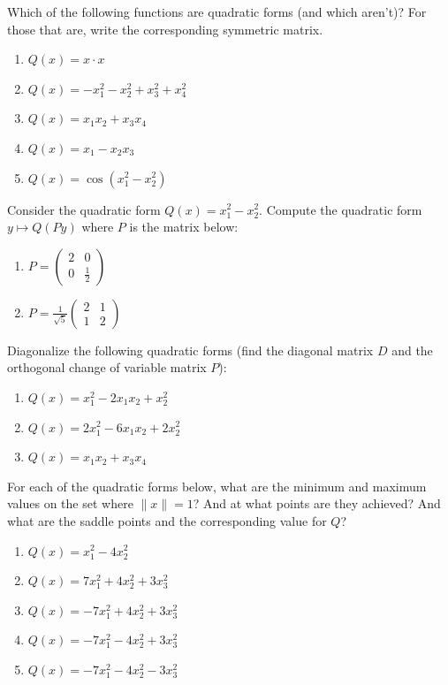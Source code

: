 \documentclass[12pt,letterpaper]{article}
\begin{document}
\begin{enumerate}
    \Problem Which of the following functions are quadratic forms (and which aren't)? For those that are, write the corresponding symmetric matrix.
    \begin{enumerate}
        \item $Q(x) = x \cdot x$\vfill
        \item $Q(x) = -x_1^2 - x_2^2 + x_3^2 + x_4^2$\vfill
        \item $Q(x) = x_1x_2 + x_3x_4$\vfill
        \item $Q(x) = x_1 - x_2x_3$\vfill
        \item $Q(x) = \cos(x_1^2 - x_2^2)$\vfill
    \end{enumerate}

\newpage

    \Problem Consider the quadratic form $Q(x) = x_1^2 - x_2^2$. Compute the quadratic form $y \mapsto Q(Py)$ where $P$ is the matrix below:
    \begin{enumerate}
        \item $P = \begin{pmatrix} 2 & 0 \\ 0 & \frac{1}{2} \end{pmatrix}$\vfill
        \item $P = \frac{1}{\sqrt{5}} \begin{pmatrix} 2 & 1 \\ 1 & 2 \end{pmatrix}$\vfill
    \end{enumerate}

    \Problem Diagonalize the following quadratic forms (find the diagonal matrix $D$ and the orthogonal change of variable matrix $P$):
    \begin{enumerate}
        \item $Q(x) = x_1^2 - 2x_1x_2 + x_2^2$\vfill
        \item $Q(x) = 2x_1^2 - 6x_1x_2 + 2x_2^2$\vfill
        \item $Q(x) = x_1x_2 + x_3x_4$\vfill
    \end{enumerate}

\newpage
    \Problem For each of the quadratic forms below, what are the minimum and maximum values on the set where $\|x\| = 1$? And at what points are they achieved? And what are the saddle points and the corresponding value for $Q$?
    \begin{enumerate}
        \item $Q(x) = x_1^2 - 4x_2^2$\vfill
        \item $Q(x) = 7x_1^2 + 4x_2^2 + 3x_3^2$\vfill
        \item $Q(x) = -7x_1^2 + 4x_2^2 + 3x_3^2$\vfill
        \item $Q(x) = -7x_1^2 - 4x_2^2 + 3x_3^2$\vfill
        \item $Q(x) = -7x_1^2 - 4x_2^2 - 3x_3^2$\vfill
    \end{enumerate}


\end{enumerate}
\end{document}
